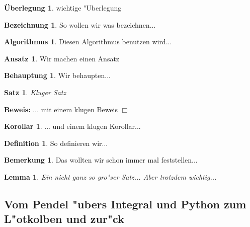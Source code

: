 \documentclass[10pt,a4paper, twoside]{article}
\newcounter{oursec}
\theoremstyle{definition}
\newtheorem*{Ueberlegung}{\"Uberlegung}
\newtheorem*{Bezeichnung}{Bezeichnung}
\newtheorem*{Algorithmus}{Algorithmus}
\newtheorem*{Ansatz}{Ansatz}
\newtheorem*{Behauptung}{Behauptung}
\newtheorem{Korollar}{Korollar}[subsection]
\newtheorem{Definition}{Definition}[subsection]
\newtheorem{Bemerkung}{Bemerkung}[subsection]
\newenvironment{Beweis}{\noindent\textbf{Beweis:}}{\hfill $\Box$ }
\theoremstyle{plain}
\newtheorem{Satz}{Satz}[subsection]
\newtheorem{Lemma}{Lemma}[subsection]
\numberwithin{equation}{subsection}
\begin{document}
\begin{Ueberlegung}
wichtige "Uberlegung
\end{Ueberlegung}

\begin{Bezeichnung}
So wollen wir was bezeichnen...
\end{Bezeichnung}

\begin{Algorithmus}
Diesen Algorithmus benutzen wird...
\end{Algorithmus}
\begin{Ansatz}
Wir machen einen Ansatz
\end{Ansatz}

\begin{Behauptung}
Wir behaupten...
\end{Behauptung}

\begin{Satz}
Kluger Satz
\end{Satz}
\begin{Beweis}
... mit einem klugen Beweis
\end{Beweis}
\begin{Korollar}
... und einem klugen Korollar...
\end{Korollar}

\begin{Definition}
So definieren wir...
\end{Definition}
\begin{Bemerkung}
Das wollten wir schon immer mal feststellen...
\end{Bemerkung}
\begin{Lemma}
Ein nicht ganz so gro"ser Satz... Aber trotzdem wichtig...
\end{Lemma}


\newpage
\subsection*{Vom Pendel "ubers Integral und Python zum L"otkolben und zur"ck}

\setcounter{Beispiel}{0}
\setcounter{equation}{0}

\setcounter{Satz}{0}
\setcounter{Lemma}{0}
\setcounter{Korollar}{0}
\setcounter{Definition}{0}
\setcounter{Bemerkung}{0}
\setcounter{oursec}{0}
\end{document}
